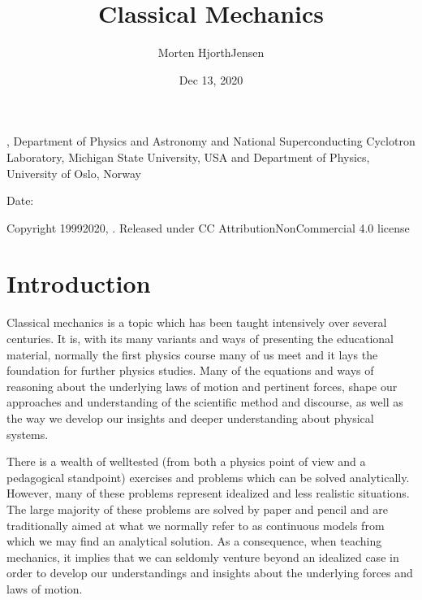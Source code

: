 \documentclass[letterpaper,10pt,english]{sphinxmanual}
\title{Classical Mechanics}
\date{Dec 13, 2020}
\author{Morten Hjorth\sphinxhyphen{}Jensen}
\begin{document}
\pagestyle{empty}
\sphinxmaketitle
\pagestyle{plain}
\sphinxtableofcontents
\pagestyle{normal}
\label{\detokenize{chapter1::doc}}








, Department of Physics and Astronomy and National Superconducting Cyclotron Laboratory, Michigan State University, USA and Department of Physics, University of Oslo, Norway









Date: 

Copyright 1999\sphinxhyphen{}2020, . Released under CC Attribution\sphinxhyphen{}NonCommercial 4.0 license


\chapter{Introduction}
\label{\detokenize{chapter1:introduction}}
Classical mechanics is a topic which has been taught intensively over
several centuries. It is, with its many variants and ways of
presenting the educational material, normally the first  physics
course many of us meet and it lays the foundation for further physics
studies. Many of the equations and ways of reasoning about the
underlying laws of motion and pertinent forces, shape our approaches and understanding
of the scientific method and discourse, as well as the way we develop our insights
and deeper understanding about physical systems.

There is a wealth of
well\sphinxhyphen{}tested (from both a physics point of view and a pedagogical
standpoint) exercises and problems which can be solved
analytically. However, many of these problems represent idealized and
less realistic situations.  The large majority of these problems are
solved by paper and pencil and are traditionally aimed
at what we normally refer to as continuous models from which we may find an analytical solution.  As a consequence,
when teaching mechanics, it implies that we can seldomly venture beyond an idealized case
in order to develop our understandings and insights about the
underlying forces and laws of motion.
\end{document}
